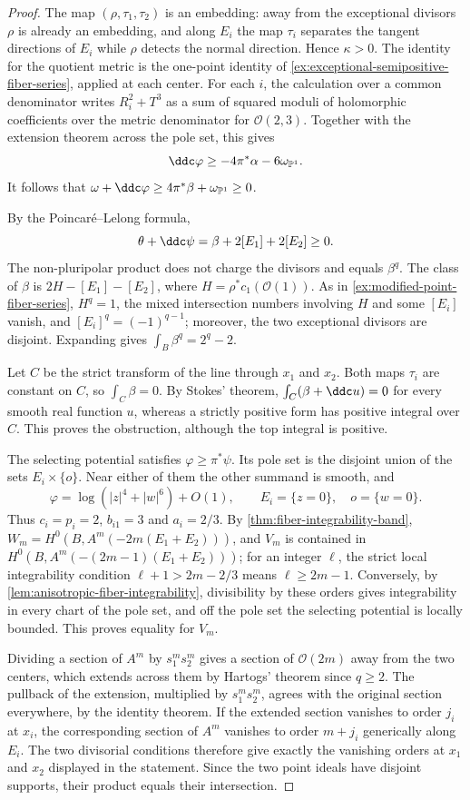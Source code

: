 \begin{proof}
The map $(\rho,\tau_1,\tau_2)$ is an embedding: away from the exceptional divisors $\rho$ is already an embedding, and along $E_i$ the map $\tau_i$ separates the tangent directions of $E_i$ while $\rho$ detects the normal direction. Hence $\kappa>0$. The identity for the quotient metric is the one-point identity of \cref{ex:exceptional-semipositive-fiber-series}, applied at each center. For each $i$, the calculation over a common denominator writes $R_i^2+T^3$ as a sum of squared moduli of holomorphic coefficients over the metric denominator for $\mathcal O(2,3)$. Together with the extension theorem across the pole set, this gives
\[
 \ddc\varphi\geq-4\pi^*\alpha-6\omega_{\mathbb P^1}.
\]
It follows that $\omega+\ddc\varphi\geq4\pi^*\beta+\omega_{\mathbb P^1}\geq0$.

By the Poincar\'e--Lelong formula,
\[
 \theta+\ddc\psi=\beta+2[E_1]+2[E_2]\geq0.
\]
The non-pluripolar product does not charge the divisors and equals $\beta^q$. The class of $\beta$ is $2H-[E_1]-[E_2]$, where $H=\rho^*c_1(\mathcal O(1))$. As in \cref{ex:modified-point-fiber-series}, $H^q=1$, the mixed intersection numbers involving $H$ and some $[E_i]$ vanish, and $[E_i]^q=(-1)^{q-1}$; moreover, the two exceptional divisors are disjoint. Expanding gives $\int_B\beta^q=2^q-2$.

Let $C$ be the strict transform of the line through $x_1$ and $x_2$. Both maps $\tau_i$ are constant on $C$, so $\int_C\beta=0$. By Stokes' theorem, $\int_C(\beta+\ddc u)=0$ for every smooth real function $u$, whereas a strictly positive form has positive integral over $C$. This proves the obstruction, although the top integral is positive.

The selecting potential satisfies $\varphi\geq\pi^*\psi$. Its pole set is the disjoint union of the sets $E_i\times\{o\}$. Near either of them the other summand is smooth, and
\[
 \varphi=\log(|z|^4+|w|^6)+O(1),\qquad
 E_i=\{z=0\},\quad o=\{w=0\}.
\]
Thus $c_i=p_i=2$, $b_{i1}=3$ and $a_i=2/3$. By \cref{thm:fiber-integrability-band}, $W_m=H^0(B,A^m(-2m(E_1+E_2)))$, and $V_m$ is contained in $H^0(B,A^m(-(2m-1)(E_1+E_2)))$; for an integer $\ell$, the strict local integrability condition $\ell+1>2m-2/3$ means $\ell\geq2m-1$. Conversely, by \cref{lem:anisotropic-fiber-integrability}, divisibility by these orders gives integrability in every chart of the pole set, and off the pole set the selecting potential is locally bounded. This proves equality for $V_m$.

Dividing a section of $A^m$ by $s_1^ms_2^m$ gives a section of $\mathcal O(2m)$ away from the two centers, which extends across them by Hartogs' theorem since $q\geq2$. The pullback of the extension, multiplied by $s_1^ms_2^m$, agrees with the original section everywhere, by the identity theorem. If the extended section vanishes to order $j_i$ at $x_i$, the corresponding section of $A^m$ vanishes to order $m+j_i$ generically along $E_i$. The two divisorial conditions therefore give exactly the vanishing orders at $x_1$ and $x_2$ displayed in the statement. Since the two point ideals have disjoint supports, their product equals their intersection.


\end{proof}
